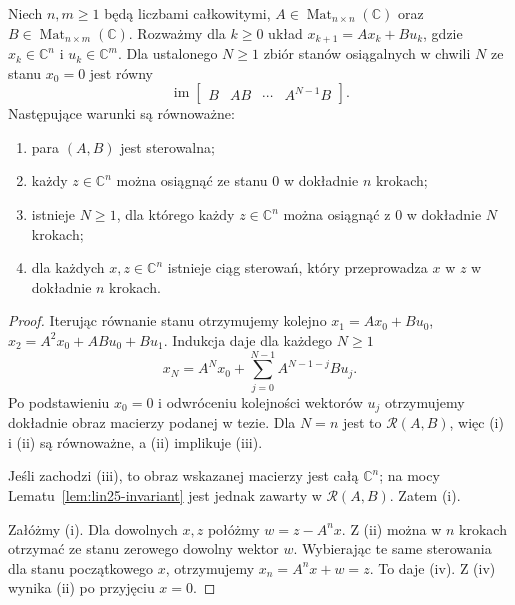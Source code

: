 \begin{twierdzenie}
\label{thm:lin25-kalman}
Niech \(n,m\ge1\) będą liczbami całkowitymi,
\(A\in\operatorname{Mat}_{n\times n}(\mathbb C)\)
oraz \(B\in\operatorname{Mat}_{n\times m}(\mathbb C)\).
Rozważmy dla \(k\ge0\) układ
\(x_{k+1}=Ax_k+Bu_k\),
gdzie \(x_k\in\mathbb C^n\)
i \(u_k\in\mathbb C^m\).
Dla ustalonego \(N\ge1\)
zbiór stanów osiągalnych
w chwili \(N\) ze stanu \(x_0=0\)
jest równy
\[
 \operatorname{im}
 \begin{bmatrix}
 B&AB&\cdots&A^{N-1}B
 \end{bmatrix}.
\]
Następujące warunki
są równoważne:
\begin{enumerate}[label=\textup{(\roman*)}]
 \item para \((A,B)\) jest sterowalna;
 \item każdy \(z\in\mathbb C^n\)
 można osiągnąć ze stanu \(0\)
 w dokładnie \(n\) krokach;
 \item istnieje \(N\ge1\),
 dla którego każdy
 \(z\in\mathbb C^n\)
 można osiągnąć z \(0\)
 w dokładnie \(N\) krokach;
 \item dla każdych \(x,z\in\mathbb C^n\)
 istnieje ciąg sterowań,
 który przeprowadza \(x\)
 w \(z\) w dokładnie \(n\) krokach.
\end{enumerate}
\end{twierdzenie}
\begin{proof}
Iterując równanie stanu
otrzymujemy kolejno
\(x_1=Ax_0+Bu_0\),
\(x_2=A^2x_0+ABu_0+Bu_1\).
Indukcja daje dla każdego \(N\ge1\)
\[
 x_N=A^Nx_0+
      \sum_{j=0}^{N-1}A^{N-1-j}Bu_j.
\]
Po podstawieniu \(x_0=0\)
i odwróceniu kolejności
wektorów \(u_j\)
otrzymujemy dokładnie obraz
macierzy podanej w tezie.
Dla \(N=n\) jest to
\(\mathcal R(A,B)\),
więc (i) i (ii) są równoważne,
a (ii) implikuje (iii).

Jeśli zachodzi (iii),
to obraz wskazanej macierzy
jest całą \(\mathbb C^n\);
na mocy
Lematu~\ref{lem:lin25-invariant}
jest jednak zawarty
w \(\mathcal R(A,B)\).
Zatem (i).

Załóżmy (i).
Dla dowolnych \(x,z\)
połóżmy \(w=z-A^nx\).
Z (ii) można w \(n\) krokach
otrzymać ze stanu zerowego
dowolny wektor \(w\).
Wybierając te same sterowania
dla stanu początkowego \(x\),
otrzymujemy
\(x_n=A^nx+w=z\).
To daje (iv).
Z (iv) wynika (ii)
po przyjęciu \(x=0\).
\end{proof}

